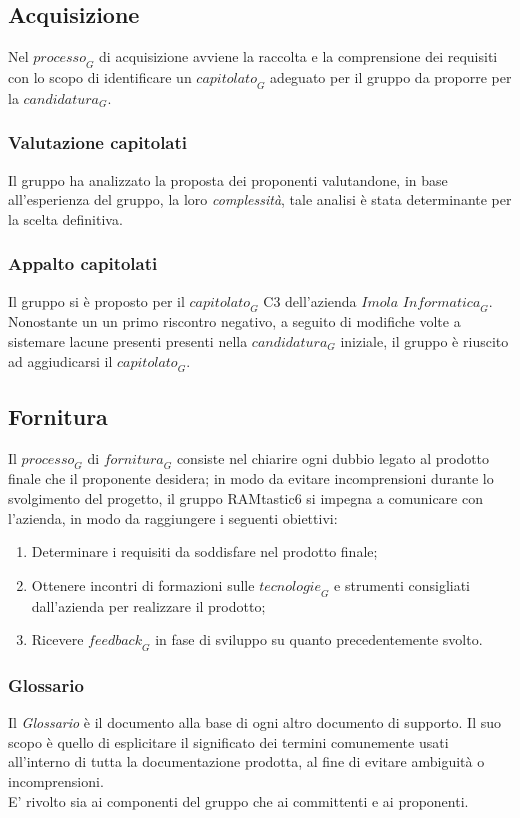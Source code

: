 \subsection{Acquisizione}
Nel $\textit{processo}_G$ di acquisizione avviene la raccolta e la comprensione dei requisiti con lo scopo di identificare un $\textit{capitolato}_G$ adeguato per il gruppo da proporre per la $\textit{candidatura}_G$.
\subsubsection{Valutazione capitolati}
Il gruppo ha analizzato la proposta dei proponenti valutandone, in base all'esperienza del gruppo, la loro \textit{complessità}, tale analisi è stata determinante per la scelta definitiva.
\subsubsection{Appalto capitolati}
Il gruppo si è proposto per il $\textit{capitolato}_G$ C3 dell'azienda $\textit{Imola Informatica}_G$. Nonostante un  un primo riscontro negativo, a seguito di modifiche volte a sistemare lacune presenti  presenti nella $\textit{candidatura}_G$ iniziale, il gruppo è riuscito ad aggiudicarsi il $\textit{capitolato}_G$.

\subsection{Fornitura}
Il $\textit{processo}_G$ di $\textit{fornitura}_G$ consiste nel chiarire ogni dubbio legato al prodotto finale che il proponente desidera; in modo da evitare incomprensioni durante lo svolgimento del progetto, il gruppo RAMtastic6 si impegna a comunicare con l'azienda, in modo da raggiungere i seguenti obiettivi:
\begin{enumerate}
    \item Determinare i requisiti da soddisfare nel prodotto finale;
    \item Ottenere incontri di formazioni sulle $\textit{tecnologie}_G$ e strumenti consigliati dall'azienda per realizzare il prodotto;
    \item Ricevere $\textit{feedback}_G$ in fase di sviluppo su quanto precedentemente svolto.
\end{enumerate}

\subsubsection{Glossario}
Il \textit{Glossario} è il documento alla base di ogni altro documento di supporto. Il suo scopo è quello di esplicitare il significato dei termini comunemente usati all'interno di tutta la documentazione prodotta, al fine di evitare ambiguità o incomprensioni. \\
E' rivolto sia ai componenti del gruppo che ai committenti e ai proponenti. 

